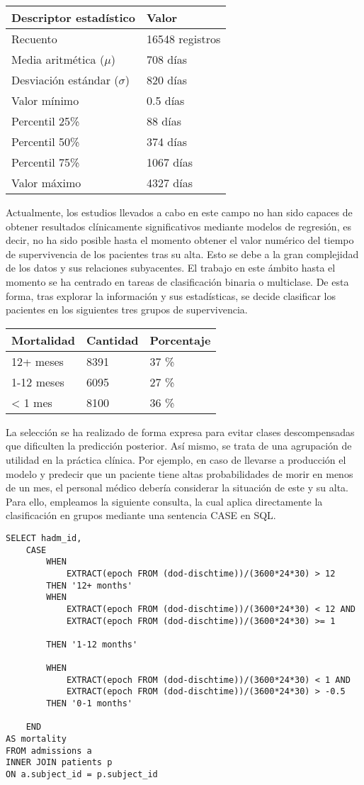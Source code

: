 \documentclass{report}
\begin{document}
\begin{longtable}[]{@{}ll@{}}
\toprule
Descriptor estadístico & Valor\tabularnewline
\midrule
\endhead
Recuento & 16548 registros\tabularnewline
Media aritmética ($\mu$) & 708 días\tabularnewline
Desviación estándar ($\sigma$) & 820 días\tabularnewline
Valor mínimo & 0.5 días\tabularnewline
Percentil 25\% & 88 días\tabularnewline
Percentil 50\% & 374 días\tabularnewline
Percentil 75\% & 1067 días\tabularnewline
Valor máximo & 4327 días\tabularnewline
\bottomrule
\end{longtable}

Actualmente, los estudios llevados a cabo en este campo no han sido capaces de obtener resultados clínicamente significativos mediante modelos de regresión, es decir, no ha sido posible hasta el momento obtener el valor numérico del tiempo de supervivencia de los pacientes tras su alta. Esto se debe a la gran complejidad de los datos y sus relaciones subyacentes. El trabajo en este ámbito hasta el momento se ha centrado en tareas de clasificación binaria o multiclase. De esta forma, tras explorar la información y sus estadísticas, se decide clasificar los pacientes en los siguientes tres grupos de supervivencia.

\begin{longtable}[]{@{}lll@{}}
\toprule
Mortalidad & Cantidad & Porcentaje\tabularnewline
\midrule
\endhead
12+ meses & 8391 & 37 \%\tabularnewline
1-12 meses & 6095 & 27 \%\tabularnewline
\textless{} 1 mes & 8100 & 36 \%\tabularnewline
\bottomrule
\end{longtable}

La selección se ha realizado de forma expresa para evitar clases descompensadas que dificulten la predicción posterior. Así mismo, se trata de una agrupación de utilidad en la práctica clínica.
\newpage
 Por ejemplo, en caso de llevarse a producción el modelo y predecir que un paciente tiene altas probabilidades de morir en menos de un mes, el personal médico debería considerar la situación de este y su alta. Para ello, empleamos la siguiente consulta, la cual aplica directamente la clasificación en grupos mediante una sentencia CASE en SQL.

\begin{verbatim}
SELECT hadm_id,
	CASE
		WHEN
    		EXTRACT(epoch FROM (dod-dischtime))/(3600*24*30) > 12 
    	THEN '12+ months'
    	WHEN 
    		EXTRACT(epoch FROM (dod-dischtime))/(3600*24*30) < 12 AND
     		EXTRACT(epoch FROM (dod-dischtime))/(3600*24*30) >= 1

    	THEN '1-12 months'
    									
   		WHEN
    		EXTRACT(epoch FROM (dod-dischtime))/(3600*24*30) < 1 AND
    		EXTRACT(epoch FROM (dod-dischtime))/(3600*24*30) > -0.5
    	THEN '0-1 months'	
    									
    END
AS mortality
FROM admissions a
INNER JOIN patients p
ON a.subject_id = p.subject_id
\end{verbatim}
\newpage
\end{document}
